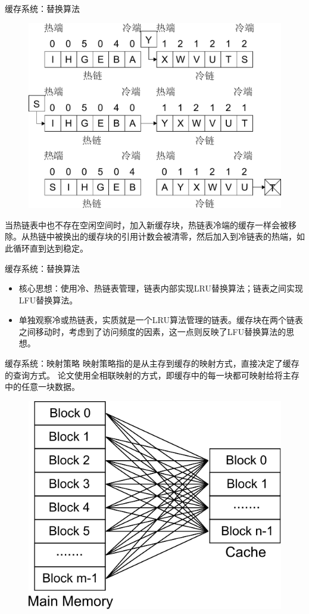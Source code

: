\documentclass[compress]{beamer}
\begin{document}
\begin{frame}{缓存系统：替换算法}
\begin{figure}
\includegraphics[width=0.6\linewidth]{../graph/replace-algo-4}
\end{figure}
当热链表中也不存在空闲空间时，加入新缓存块，热链表冷端的缓存一样会被移除。从热链中被换出的缓存块的引用计数会被清零，然后加入到冷链表的热端，如此循环直到达到稳定。
\end{frame}

\begin{frame}{缓存系统：替换算法}
\begin{itemize}
\item 核心思想：使用冷、热链表管理，链表内部实现LRU替换算法；链表之间实现LFU替换算法。
\item 单独观察冷或热链表，实质就是一个LRU算法管理的链表。缓存块在两个链表之间移动时，考虑到了访问频度的因素，这一点则反映了LFU替换算法的思想。
\end{itemize}
\end{frame}

\begin{frame}{缓存系统：映射策略}
映射策略指的是从主存到缓存的映射方式，直接决定了缓存的查询方式。
论文使用全相联映射的方式，即缓存中的每一块都可映射给将主存中的任意一块数据。
\begin{figure}
\includegraphics[width=0.5\linewidth]{../graph/cache-map-2}
\end{figure}
\end{frame}
\end{document}
